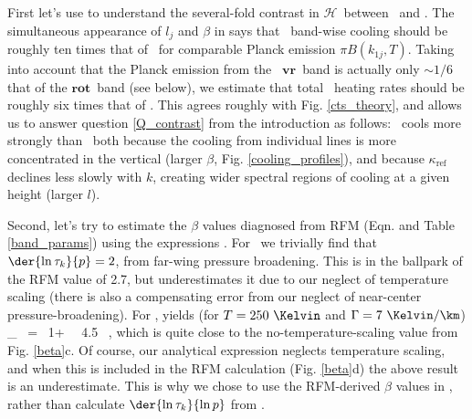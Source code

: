 \documentclass[10pt]{article}
\newcommand{\ch}{\ensuremath{\mathcal{H}}}
\newcommand{\lj}{\ensuremath{l_j}}
\newcommand{\tauk}{\ensuremath{\tau_k}}
\newcommand{\kapparef}{\ensuremath{\kappa_{\mathrm{ref}}}}
\newcommand{\konej}{\ensuremath{k_{1j}}}
\newcommand{\vr}{\ensuremath{\mathbf{vr}}}
\newcommand{\rot}{\ensuremath{\mathbf{rot}}}
\begin{document}
First let's use  to understand the several-fold contrast in \ch\ between \htwo\ and \cotwo. The simultaneous appearance of $\lj$ and $\beta$ in   says that \htwo\ band-wise cooling should be roughly ten times that of \cotwo\, for comparable Planck emission $\pi B(\konej,T)$. Taking into account that the Planck emission from the \htwo\ \vr\ band is actually only $\sim 1/6$ that of the \rot\ band (see below), we estimate that total \htwo\ heating rates should be roughly six times that of \cotwo. This agrees roughly with Fig. \ref{cts_theory}, and allows us to answer question \ref{Q_contrast} from the introduction as follows: \htwo\ cools more strongly than \cotwo\  both because the cooling from individual lines is more concentrated in the vertical (larger $\beta$, Fig. \ref{cooling_profiles}), and because $\kapparef$ declines less slowly with $k$, creating wider spectral regions of cooling at a given height (larger $l$).

Second, let's try to estimate the $\beta$ values diagnosed from RFM (Eqn.  and Table \ref{band_params}) using the expressions . For \cotwo\ we trivially find that $\der{\ln \tauk}{p} = 2$, from far-wing pressure broadening. This is in the ballpark of the RFM value of 2.7, but underestimates it due to our neglect of temperature scaling (there is also a compensating error from our neglect of near-center pressure-broadening). For \htwo,  yields (for $T= 250\ \Kelvin$ and $\Gamma=7\ \Kelvin/\km$)
\beqn
	\beta_{\htwo} \ = \ 1+  \ \approx \ 4.5 \ ,
	\label{beta_h2o_est}
\eeqn
which is quite close to the no-temperature-scaling value from Fig. \ref{beta}c. Of course, our analytical expression  neglects temperature scaling, and when this is included in the RFM calculation (Fig. \ref{beta}d) the above result is an underestimate. This is why we chose to use the RFM-derived $\beta$ values in , rather than calculate $\der{\ln\tauk}{\ln p}$ from . %
\end{document}
